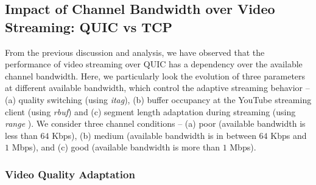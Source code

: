 \subsection{Impact of Channel Bandwidth over Video Streaming: QUIC vs TCP}
From the previous discussion and analysis, we have observed that the performance of video streaming over \ac{QUIC} has a dependency over the available channel bandwidth. 
Here, we particularly look the evolution of three parameters at different available bandwidth, which control the adaptive streaming behavior -- (a) quality switching (using \textit{itag}), (b) buffer occupancy at the YouTube streaming client (using \textit{rbuf}) and (c) segment length adaptation during streaming (using \textit{range} ). We consider three channel conditions -- (a) poor (available bandwidth is less than $64$ Kbps), (b) medium (available bandwidth is in between $64$ Kbps and $1$ Mbps), and (c) good (available bandwidth is more than $1$ Mbps).

\subsubsection{Video Quality Adaptation}
%
%
%
%
%




